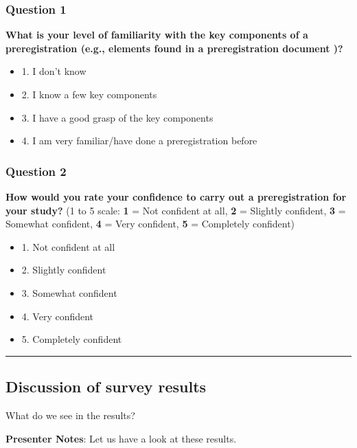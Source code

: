 \documentclass[
  letterpaper,
  DIV=11,
  numbers=noendperiod]{scrartcl}
\begin{document}
\subsubsection{Question 1}

\textbf{What is your level of familiarity with the key components of a
preregistration (e.g., elements found in a preregistration document )?}

\begin{itemize}
\item[$\square$]
  1. I don't know
\item[$\square$]
  2. I know a few key components
\item[$\square$]
  3. I have a good grasp of the key components
\item[$\square$]
  4. I am very familiar/have done a preregistration before
\end{itemize}

\subsubsection{Question 2}

\textbf{How would you rate your confidence to carry out a
preregistration for your study?} (1 to 5 scale: \textbf{1} = Not
confident at all, \textbf{2} = Slightly confident, \textbf{3} = Somewhat
confident, \textbf{4} = Very confident, \textbf{5} = Completely
confident)

\begin{itemize}
\item[$\square$]
  1. Not confident at all
\item[$\square$]
  2. Slightly confident
\item[$\square$]
  3. Somewhat confident
\item[$\square$]
  4. Very confident
\item[$\square$]
  5. Completely confident
\end{itemize}

\begin{center}\rule{0.5\linewidth}{0.5pt}\end{center}

\subsection{Discussion of survey
results}\label{discussion-of-survey-results}

What do we see in the results?

\textbf{Presenter Notes}: Let us have a look at these results.
\end{document}
